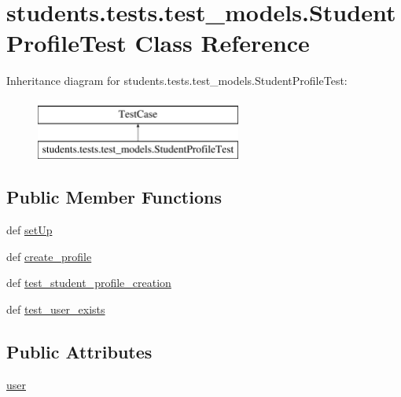\hypertarget{classstudents_1_1tests_1_1test__models_1_1_student_profile_test}{\section{students.\-tests.\-test\-\_\-models.\-Student\-Profile\-Test Class Reference}
\label{classstudents_1_1tests_1_1test__models_1_1_student_profile_test}
}
Inheritance diagram for students.\-tests.\-test\-\_\-models.\-Student\-Profile\-Test\-:\begin{figure}[H]
\begin{center}
\leavevmode
\includegraphics[height=2.000000cm]{classstudents_1_1tests_1_1test__models_1_1_student_profile_test}
\end{center}
\end{figure}
\subsection*{Public Member Functions}
\begin{DoxyCompactItemize}
\item 
def \hyperlink{classstudents_1_1tests_1_1test__models_1_1_student_profile_test_a34c2073c3f3d54023e1cbb35637d5b65}{set\-Up}
\item 
def \hyperlink{classstudents_1_1tests_1_1test__models_1_1_student_profile_test_a86b4cdabc7be80f9e5a9fd4aafb4dc73}{create\-\_\-profile}
\item 
def \hyperlink{classstudents_1_1tests_1_1test__models_1_1_student_profile_test_a2caa47c09a3227ab1dc5a7fe4273045e}{test\-\_\-student\-\_\-profile\-\_\-creation}
\item 
def \hyperlink{classstudents_1_1tests_1_1test__models_1_1_student_profile_test_ac5c9a7314462b9032988018e98b2555c}{test\-\_\-user\-\_\-exists}
\end{DoxyCompactItemize}
\subsection*{Public Attributes}
\begin{DoxyCompactItemize}
\item 
\hyperlink{classstudents_1_1tests_1_1test__models_1_1_student_profile_test_a500cb304853bbf13f8d667f366828573}{user}
\end{DoxyCompactItemize}


